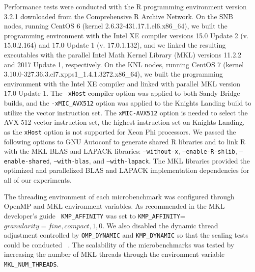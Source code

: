 Performance tests were conducted with the R programming environment version 3.2.1
downloaded from the Comprehensive R Archive Network. On the SNB nodes, running CentOS 6
(kernel 2.6.32-431.17.1.el6.x86\_64), we built the programming environment with the Intel
XE compiler versions 15.0 Update 2 (v. 15.0.2.164) and 17.0 Update 1 (v. 17.0.1.132), and
we linked the resulting executables with the parallel Intel Math Kernel Library (MKL)
versions 11.2.2 and 2017 Update 1, respectively. On the KNL nodes, running CentOS 7
(kernel 3.10.0-327.36.3.el7.xpps1\_1.4.1.3272.x86\_64), we built the programming
environment with the Intel XE compiler and linked with parallel MKL version 17.0 Update 1.
The \texttt{-xHost} compiler option was applied to both Sandy Bridge builds, and the
\texttt{-xMIC\_AVX512} option was applied to the Knights Landing build to utilize the
vector instruction set. The \texttt{xMIC-AVX512} option is needed to select the AVX-512
vector instruction set, the highest instruction set on Knights Landing, as the
\texttt{xHost} option is not supported for Xeon Phi processors. We passed the following
options to GNU Autoconf to generate shared R libraries and to link R with the MKL BLAS and
LAPACK libraries: \texttt{--without-x}, \texttt{--enable-R-shlib},
\texttt{--enable-shared}, \texttt{--with-blas}, and \texttt{--with-lapack}.
The MKL libraries provided the optimized and parallelized BLAS and LAPACK implementation
  dependencies for all of our experiments.

The threading environment of each microbenchmark was configured through OpenMP and MKL
environment variables. As recommended in the MKL developer's guide~\cite{intel:mkl2017}
\texttt{KMP\_AFFINITY} was set to \texttt{KMP\_AFFINITY}=$granularity=fine,compact,1,0$.
We also disabled the dynamic thread adjustment controlled by \texttt{OMP\_DYNAMIC} and
\texttt{KMP\_DYNAMIC} so that the scaling tests could be conducted ~\cite{intel:cpp2015,
intel:cpp2017, intel:mkl11_2, intel:mkl2017}. The scalability of the microbenchmarks was
tested by increasing the number of MKL threads through the environment variable
\texttt{MKL\_NUM\_THREADS}.

